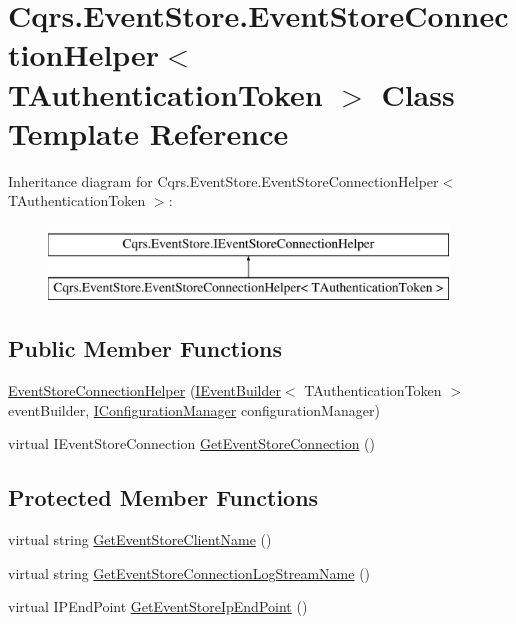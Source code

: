 \hypertarget{classCqrs_1_1EventStore_1_1EventStoreConnectionHelper}{}\section{Cqrs.\+Event\+Store.\+Event\+Store\+Connection\+Helper$<$ T\+Authentication\+Token $>$ Class Template Reference}
\label{classCqrs_1_1EventStore_1_1EventStoreConnectionHelper}
Inheritance diagram for Cqrs.\+Event\+Store.\+Event\+Store\+Connection\+Helper$<$ T\+Authentication\+Token $>$\+:\begin{figure}[H]
\begin{center}
\leavevmode
\includegraphics[height=2.000000cm]{classCqrs_1_1EventStore_1_1EventStoreConnectionHelper}
\end{center}
\end{figure}
\subsection*{Public Member Functions}
\begin{DoxyCompactItemize}
\item 
\hyperlink{classCqrs_1_1EventStore_1_1EventStoreConnectionHelper_ac9d232e255275c70aee4465b08e7fd79_ac9d232e255275c70aee4465b08e7fd79}{Event\+Store\+Connection\+Helper} (\hyperlink{interfaceCqrs_1_1EventStore_1_1IEventBuilder}{I\+Event\+Builder}$<$ T\+Authentication\+Token $>$ event\+Builder, \hyperlink{interfaceCqrs_1_1Configuration_1_1IConfigurationManager}{I\+Configuration\+Manager} configuration\+Manager)
\item 
virtual I\+Event\+Store\+Connection \hyperlink{classCqrs_1_1EventStore_1_1EventStoreConnectionHelper_a36c7ef0505319af9f8ae02da0050ab30_a36c7ef0505319af9f8ae02da0050ab30}{Get\+Event\+Store\+Connection} ()
\end{DoxyCompactItemize}
\subsection*{Protected Member Functions}
\begin{DoxyCompactItemize}
\item 
virtual string \hyperlink{classCqrs_1_1EventStore_1_1EventStoreConnectionHelper_af2520736a2fb83c8b4b03e3581980c75_af2520736a2fb83c8b4b03e3581980c75}{Get\+Event\+Store\+Client\+Name} ()
\item 
virtual string \hyperlink{classCqrs_1_1EventStore_1_1EventStoreConnectionHelper_a8c018b324a38ce67ab73e637b1aa7bec_a8c018b324a38ce67ab73e637b1aa7bec}{Get\+Event\+Store\+Connection\+Log\+Stream\+Name} ()
\item 
virtual I\+P\+End\+Point \hyperlink{classCqrs_1_1EventStore_1_1EventStoreConnectionHelper_af0cdad325bbb3b3b45fe427028a322aa_af0cdad325bbb3b3b45fe427028a322aa}{Get\+Event\+Store\+Ip\+End\+Point} ()
\end{DoxyCompactItemize}
